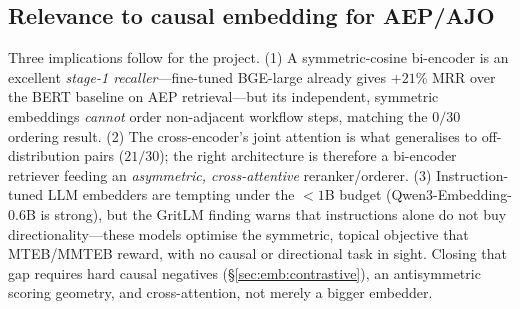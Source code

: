 \subsection*{Relevance to causal embedding for AEP/AJO}

Three implications follow for the project. (1) A symmetric-cosine bi-encoder is an
excellent \emph{stage-1 recaller}---fine-tuned BGE-large already gives $+21\%$ MRR over
the BERT baseline on AEP retrieval---but its independent, symmetric embeddings
\emph{cannot} order non-adjacent workflow steps, matching the $0/30$ ordering result.
(2) The cross-encoder's joint attention is what generalises to off-distribution pairs
($21/30$); the right architecture is therefore a bi-encoder retriever feeding an
\emph{asymmetric, cross-attentive} reranker/orderer. (3) Instruction-tuned LLM
embedders are tempting under the $<\!1$B budget (Qwen3-Embedding-0.6B is strong), but
the GritLM finding warns that instructions alone do not buy directionality---these
models optimise the symmetric, topical objective that MTEB/MMTEB reward, with no causal
or directional task in sight. Closing that gap requires hard causal negatives
(\S\ref{sec:emb:contrastive}), an antisymmetric scoring geometry, and cross-attention,
not merely a bigger embedder.
